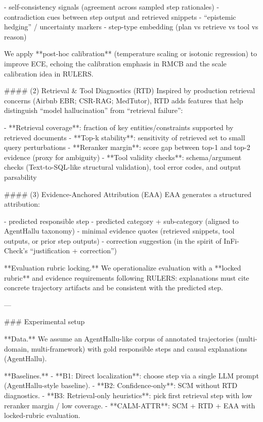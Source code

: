 - self-consistency signals (agreement across sampled step rationales)  
- contradiction cues between step output and retrieved snippets  
- “epistemic hedging” / uncertainty markers  
- step-type embedding (plan vs retrieve vs tool vs reason)

We apply **post-hoc calibration** (temperature scaling or isotonic regression) to improve ECE, echoing the calibration emphasis in RMCB and the scale calibration idea in RULERS.

#### (2) Retrieval & Tool Diagnostics (RTD)  
Inspired by production retrieval concerns (Airbnb EBR; CSR-RAG; MedTutor), RTD adds features that help distinguish “model hallucination” from “retrieval failure”:

- **Retrieval coverage**: fraction of key entities/constraints supported by retrieved documents  
- **Top-k stability**: sensitivity of retrieved set to small query perturbations  
- **Reranker margin**: score gap between top-1 and top-2 evidence (proxy for ambiguity)  
- **Tool validity checks**: schema/argument checks (Text-to-SQL-like structural validation), tool error codes, and output parsability

#### (3) Evidence-Anchored Attribution (EAA)  
EAA generates a structured attribution:

- predicted responsible step  
- predicted category + sub-category (aligned to AgentHallu taxonomy)  
- minimal evidence quotes (retrieved snippets, tool outputs, or prior step outputs)  
- correction suggestion (in the spirit of InFi-Check’s “justification + correction”)

**Evaluation rubric locking.** We operationalize evaluation with a **locked rubric** and evidence requirements following RULERS: explanations must cite concrete trajectory artifacts and be consistent with the predicted step.

---

### Experimental setup  

**Data.** We assume an AgentHallu-like corpus of annotated trajectories (multi-domain, multi-framework) with gold responsible steps and causal explanations (AgentHallu).  

**Baselines.**
- **B1: Direct localization**: choose step via a single LLM prompt (AgentHallu-style baseline).  
- **B2: Confidence-only**: SCM without RTD diagnostics.  
- **B3: Retrieval-only heuristics**: pick first retrieval step with low reranker margin / low coverage.  
- **CALM-ATTR**: SCM + RTD + EAA with locked-rubric evaluation.

